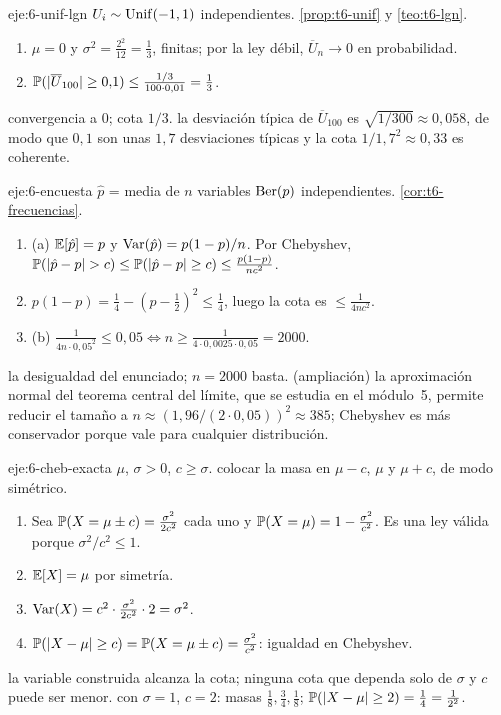 \begin{solucion}{eje:6-unif-lgn}
\datos $U_i\sim\operatorname{Unif}(-1,1)$ independientes.
\planteamiento \cref{prop:t6-unif} y \cref{teo:t6-lgn}.
\pasos
\begin{enumerate}[label=\arabic*.]
  \item $\mu=0$ y $\sigma^{2}=\frac{2^{2}}{12}=\frac13$, finitas; por la ley débil, $\overline U_n\to0$ en probabilidad.
  \item $\mathbb{P}(\lvert\overline U_{100}\rvert\ge0{,}1)\le\frac{1/3}{100\cdot0{,}01}=\frac13$.
\end{enumerate}
\resultado convergencia a 0; cota $1/3$.
\comprobacion la desviación típica de $\overline U_{100}$ es $\sqrt{1/300}\approx0{,}058$, de modo que $0{,}1$ son unas $1{,}7$ desviaciones típicas y la cota $1/1{,}7^{2}\approx0{,}33$ es coherente.
\end{solucion}

\begin{solucion}{eje:6-encuesta}
\datos $\hat p$ = media de $n$ variables $\operatorname{Ber}(p)$ independientes.
\planteamiento \cref{cor:t6-frecuencias}.
\pasos
\begin{enumerate}[label=\arabic*.]
  \item (a) $\mathbb{E}[\hat p]=p$ y $\operatorname{Var}(\hat p)=p(1-p)/n$. Por Chebyshev, $\mathbb{P}(\lvert\hat p-p\rvert>c)\le\mathbb{P}(\lvert\hat p-p\rvert\ge c)\le\frac{p(1-p)}{nc^{2}}$.
  \item $p(1-p)=\frac14-(p-\frac12)^{2}\le\frac14$, luego la cota es $\le\frac1{4nc^{2}}$.
  \item (b) $\frac1{4n\cdot0{,}05^{2}}\le0{,}05\iff n\ge\frac{1}{4\cdot0{,}0025\cdot0{,}05}=2000$.
\end{enumerate}
\resultado la desigualdad del enunciado; $n=2000$ basta.
\comprobacion (ampliación) la aproximación normal del teorema central del límite, que se estudia en el módulo~5, permite reducir el tamaño a $n\approx(1{,}96/(2\cdot0{,}05))^{2}\approx385$; Chebyshev es más conservador porque vale para cualquier distribución.
\end{solucion}

\begin{solucion}{eje:6-cheb-exacta}
\datos $\mu$, $\sigma>0$, $c\ge\sigma$.
\planteamiento colocar la masa en $\mu-c$, $\mu$ y $\mu+c$, de modo simétrico.
\pasos
\begin{enumerate}[label=\arabic*.]
  \item Sea $\mathbb{P}(X=\mu\pm c)=\frac{\sigma^{2}}{2c^{2}}$ cada uno y $\mathbb{P}(X=\mu)=1-\frac{\sigma^{2}}{c^{2}}$. Es una ley válida porque $\sigma^{2}/c^{2}\le1$.
  \item $\mathbb{E}[X]=\mu$ por simetría.
  \item $\operatorname{Var}(X)=c^{2}\cdot\frac{\sigma^{2}}{2c^{2}}\cdot2=\sigma^{2}$.
  \item $\mathbb{P}(\lvert X-\mu\rvert\ge c)=\mathbb{P}(X=\mu\pm c)=\frac{\sigma^{2}}{c^{2}}$: igualdad en Chebyshev.
\end{enumerate}
\resultado la variable construida alcanza la cota; ninguna cota que dependa solo de $\sigma$ y $c$ puede ser menor.
\comprobacion con $\sigma=1$, $c=2$: masas $\frac18,\frac34,\frac18$; $\mathbb{P}(\lvert X-\mu\rvert\ge2)=\frac14=\frac1{2^{2}}$.
\end{solucion}

